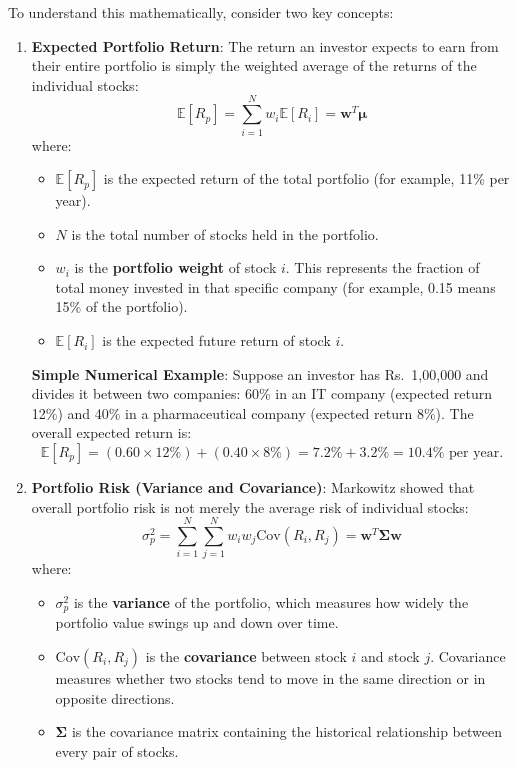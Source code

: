 To understand this mathematically, consider two key concepts:
\begin{enumerate}
    \item \textbf{Expected Portfolio Return}: The return an investor expects to earn from their entire portfolio is simply the weighted average of the returns of the individual stocks:
    \begin{equation}
    \mathbb{E}[R_p] = \sum_{i=1}^{N} w_i \mathbb{E}[R_i] = \mathbf{w}^T \boldsymbol{\mu}
    \end{equation}
    where:
    \begin{itemize}
        \item $\mathbb{E}[R_p]$ is the expected return of the total portfolio (for example, 11\% per year).
        \item $N$ is the total number of stocks held in the portfolio.
        \item $w_i$ is the \textbf{portfolio weight} of stock $i$. This represents the fraction of total money invested in that specific company (for example, 0.15 means 15\% of the portfolio).
        \item $\mathbb{E}[R_i]$ is the expected future return of stock $i$.
    \end{itemize}

    \textbf{Simple Numerical Example}: Suppose an investor has Rs.~1,00,000 and divides it between two companies: 60\% in an IT company (expected return 12\%) and 40\% in a pharmaceutical company (expected return 8\%). The overall expected return is:
    \[
    \mathbb{E}[R_p] = (0.60 \times 12\%) + (0.40 \times 8\%) = 7.2\% + 3.2\% = 10.4\% \text{ per year.}
    \]

    \item \textbf{Portfolio Risk (Variance and Covariance)}: Markowitz showed that overall portfolio risk is not merely the average risk of individual stocks:
    \begin{equation}
    \sigma_p^2 = \sum_{i=1}^{N} \sum_{j=1}^{N} w_i w_j \text{Cov}(R_i, R_j) = \mathbf{w}^T \mathbf{\Sigma} \mathbf{w}
    \end{equation}
    where:
    \begin{itemize}
        \item $\sigma_p^2$ is the \textbf{variance} of the portfolio, which measures how widely the portfolio value swings up and down over time.
        \item $\text{Cov}(R_i, R_j)$ is the \textbf{covariance} between stock $i$ and stock $j$. Covariance measures whether two stocks tend to move in the same direction or in opposite directions.
        \item $\mathbf{\Sigma}$ is the covariance matrix containing the historical relationship between every pair of stocks.
    \end{itemize}


\end{enumerate}
